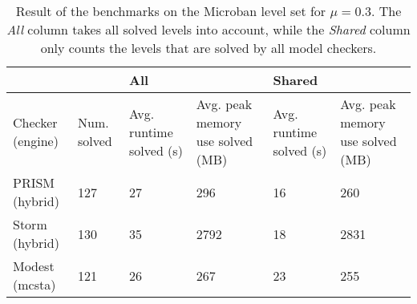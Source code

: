 \begin{table*}[ht]
\begin{tabularx}{\textwidth}{XX|XX|XX|}
\cline{3-6}
                                       &             & \multicolumn{2}{l|}{All}                                                   & \multicolumn{2}{l|}{Shared}                                                \\ \hline
\multicolumn{1}{|l|}{Checker (engine)} & Num. solved & \multicolumn{1}{l|}{Avg. runtime solved (s)} & Avg. peak memory use solved (MB) & \multicolumn{1}{l|}{Avg. runtime solved (s)} & Avg. peak memory use solved (MB) \\ \hline
\multicolumn{1}{|l|}{PRISM (hybrid)}   & 127         & \multicolumn{1}{l|}{27}                      & 296                         & \multicolumn{1}{l|}{16}                      & 260                         \\ \hline
\multicolumn{1}{|l|}{Storm (hybrid)}   & 130         & \multicolumn{1}{l|}{35}                      & 2792                        & \multicolumn{1}{l|}{18}                      & 2831                        \\ \hline
\multicolumn{1}{|l|}{Modest (mcsta)}   & 121         & \multicolumn{1}{l|}{26}                      & 267                         & \multicolumn{1}{l|}{23}                      & 255                         \\ \hline
\end{tabularx}
\caption{Result of the benchmarks on the Microban level set for $\mu=0.3$. The \textit{All} column takes all solved levels into account, while the \textit{Shared} column only counts the levels that are solved by all model checkers.}
\label{tab:benchmark_mu_0.3}
\end{table*}


